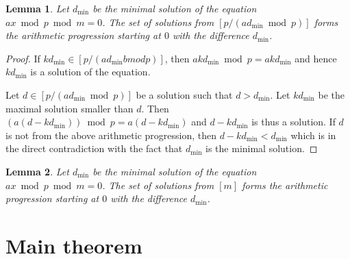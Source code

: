 \documentclass{article}
\newtheorem{lemma}{Lemma}
\begin{document}
{\color{red}
\begin{lemma}
Let $d_{\operatorname{min}}$ be the minimal solution of the equation $ax \bmod p \bmod m = 0$.
The set of solutions from $[p / ({a d_{\operatorname{min}}} \bmod p)]$ forms the arithmetic progression starting at $0$ with the difference $d_{\operatorname{min}}$.
\end{lemma}
\begin{proof}
If $k d_{\operatorname{min}} \in [p / (a d_{\operatorname{min}}  bmod p)]$, then $a k d_{\operatorname{min}} \bmod p = akd_{\operatorname{min}}$ and hence $k d_{\operatorname{min}}$ is a solution of the equation.

Let $d \in [p / (a d_{\operatorname{min}} \bmod p)]$ be a solution such that $d > d_{\operatorname{min}}$. Let $k d_{\operatorname{min}}$ be the maximal solution smaller than $d$. Then $(a(d - kd_{\operatorname{min}})) \bmod p = a(d - kd_{\operatorname{min}})$ and $d - kd_{\operatorname{min}}$ is thus a solution. 
If $d$ is not from the above arithmetic progression, then $d - 
kd_{\operatorname{min}} < d_{\operatorname{min}}$ which is in the direct 
contradiction with the fact that $d_{\operatorname{min}}$ is the minimal 
solution.
\end{proof}

\begin{lemma}
Let $d_{\operatorname{min}}$ be the minimal solution of the equation $ax \bmod p \bmod m = 0$.
The set of solutions from $[m]$ forms the arithmetic progression starting at $0$ with the difference $d_{\operatorname{min}}$.
\end{lemma}
}

\section{Main theorem}
\end{document}
